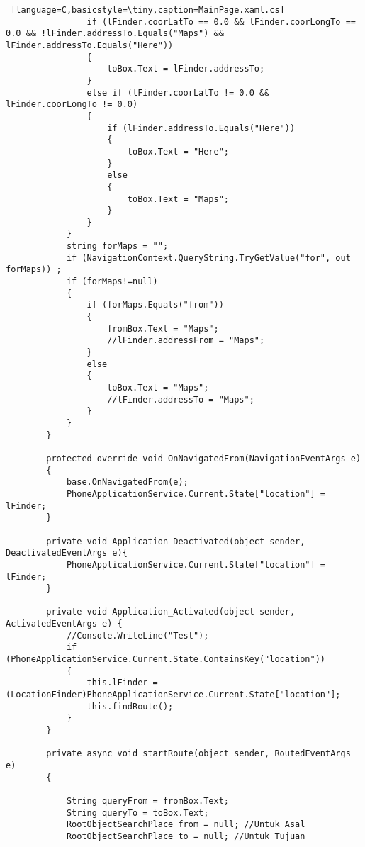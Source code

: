 \begin{lstlisting} [language=C,basicstyle=\tiny,caption=MainPage.xaml.cs]
                if (lFinder.coorLatTo == 0.0 && lFinder.coorLongTo == 0.0 && !lFinder.addressTo.Equals("Maps") && lFinder.addressTo.Equals("Here"))
                {
                    toBox.Text = lFinder.addressTo;
                }
                else if (lFinder.coorLatTo != 0.0 && lFinder.coorLongTo != 0.0)
                {
                    if (lFinder.addressTo.Equals("Here"))
                    {
                        toBox.Text = "Here";
                    }
                    else
                    {
                        toBox.Text = "Maps";
                    }
                }
            }
            string forMaps = "";
            if (NavigationContext.QueryString.TryGetValue("for", out forMaps)) ;
            if (forMaps!=null)
            {
                if (forMaps.Equals("from"))
                {
                    fromBox.Text = "Maps";
                    //lFinder.addressFrom = "Maps";
                }
                else
                {
                    toBox.Text = "Maps";
                    //lFinder.addressTo = "Maps";
                }
            }
        }

        protected override void OnNavigatedFrom(NavigationEventArgs e)
        {
            base.OnNavigatedFrom(e);
            PhoneApplicationService.Current.State["location"] = lFinder;
        }

        private void Application_Deactivated(object sender, DeactivatedEventArgs e){
            PhoneApplicationService.Current.State["location"] = lFinder;
        }

        private void Application_Activated(object sender, ActivatedEventArgs e) {
            //Console.WriteLine("Test");
            if (PhoneApplicationService.Current.State.ContainsKey("location"))
            {
                this.lFinder = (LocationFinder)PhoneApplicationService.Current.State["location"];
                this.findRoute();
            }
        }

        private async void startRoute(object sender, RoutedEventArgs e)
        {
            
            String queryFrom = fromBox.Text;
            String queryTo = toBox.Text;
            RootObjectSearchPlace from = null; //Untuk Asal
            RootObjectSearchPlace to = null; //Untuk Tujuan


\end{lstlisting}
